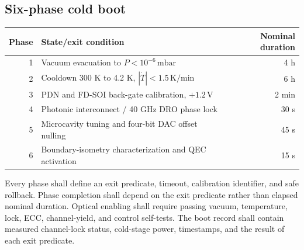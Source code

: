 \documentclass[11pt,a4paper]{article}
\newcommand{\unit}[1]{\,\mathrm{#1}}
\begin{document}
\subsection{Six-phase cold boot}
\begin{center}\small
\begin{tabular}{@{}rlr@{}}\toprule Phase & State/exit condition & Nominal duration\\\midrule
1 & Vacuum evacuation to $P<10^{-6}\unit{mbar}$ & 4 h\\
2 & Cooldown 300 K to 4.2 K, $|\dot T|<1.5\unit{K/min}$ & 6 h\\
3 & PDN and FD-SOI back-gate calibration, $+1.2\unit V$ & 2 min\\
4 & Photonic interconnect / 40 GHz DRO phase lock & 30 s\\
5 & Microcavity tuning and four-bit DAC offset nulling & 45 s\\
6 & Boundary-isometry characterization and QEC activation & 15 s\\\bottomrule
\end{tabular}\end{center}
Every phase shall define an exit predicate, timeout, calibration identifier, and safe
rollback. Phase completion shall depend on the exit predicate rather than elapsed
nominal duration. Optical enabling shall require passing vacuum, temperature, lock,
ECC, channel-yield, and control self-tests. The boot record shall contain measured
channel-lock status, cold-stage power, timestamps, and the result of each exit predicate.
\end{document}
